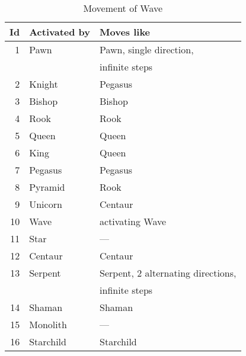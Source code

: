 \begin{table}[!h]
\centering
\begin{tabular}{ rll }
\toprule
\textbf{Id} & \textbf{Activated by} & \textbf{Moves like}                       \\
\midrule
 1          & Pawn                  & Pawn, single direction,                   \\
            &                       & infinite steps                            \\
 2          & Knight                & Pegasus                                   \\
 3          & Bishop                & Bishop                                    \\
 4          & Rook                  & Rook                                      \\
 5          & Queen                 & Queen                                     \\
 6          & King                  & Queen                                     \\ \cmidrule{1-3}
 7          & Pegasus               & Pegasus                                   \\
 8          & Pyramid               & Rook                                      \\
 9          & Unicorn               & Centaur                                   \\
10          & Wave                  & activating Wave                           \\
11          & Star                  & ---                                       \\
12          & Centaur               & Centaur                                   \\
13          & Serpent               & Serpent, 2 alternating directions,        \\
            &                       & infinite steps                            \\
14          & Shaman                & Shaman                                    \\
15          & Monolith              & ---                                       \\
16          & Starchild             & Starchild                                 \\
\bottomrule
\end{tabular}
\caption{Movement of Wave}
\label{tbl:Appendix/Movement of Wave}
\end{table}

